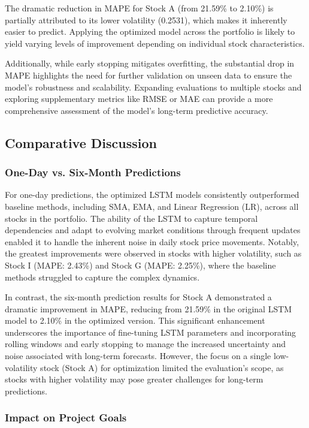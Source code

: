 \documentclass[10pt,twocolumn]{article}
\begin{document}
The dramatic reduction in MAPE for Stock A (from 21.59\% to 2.10\%) is partially attributed to its lower volatility (0.2531), which makes it inherently easier to predict. Applying the optimized model across the portfolio is likely to yield varying levels of improvement depending on individual stock characteristics.

Additionally, while early stopping mitigates overfitting, the substantial drop in MAPE highlights the need for further validation on unseen data to ensure the model's robustness and scalability. Expanding evaluations to multiple stocks and exploring supplementary metrics like RMSE or MAE can provide a more comprehensive assessment of the model's long-term predictive accuracy.

\subsection{Comparative Discussion}

\subsubsection{One-Day vs. Six-Month Predictions}

For one-day predictions, the optimized LSTM models consistently outperformed baseline methods, including SMA, EMA, and Linear Regression (LR), across all stocks in the portfolio. The ability of the LSTM to capture temporal dependencies and adapt to evolving market conditions through frequent updates enabled it to handle the inherent noise in daily stock price movements. Notably, the greatest improvements were observed in stocks with higher volatility, such as Stock I (MAPE: 2.43\%) and Stock G (MAPE: 2.25\%), where the baseline methods struggled to capture the complex dynamics.

In contrast, the six-month prediction results for Stock A demonstrated a dramatic improvement in MAPE, reducing from 21.59\% in the original LSTM model to 2.10\% in the optimized version. This significant enhancement underscores the importance of fine-tuning LSTM parameters and incorporating rolling windows and early stopping to manage the increased uncertainty and noise associated with long-term forecasts. However, the focus on a single low-volatility stock (Stock A) for optimization limited the evaluation's scope, as stocks with higher volatility may pose greater challenges for long-term predictions.

\subsubsection{Impact on Project Goals}
\end{document}
